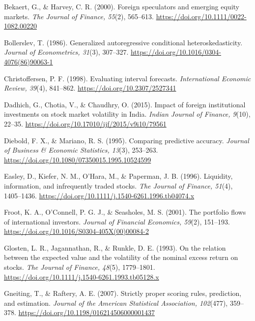 \documentclass[12pt]{article}
\newenvironment{apareferences}
  {\begin{list}{}{%
     \setlength{\leftmargin}{0.5in}%
     \setlength{\itemindent}{-0.5in}%
     \setlength{\listparindent}{0pt}%
     \setlength{\itemsep}{0.5\baselineskip}}}
  {\end{list}}
\begin{document}
\begin{singlespace}
\begin{apareferences}

\item Bekaert, G., \& Harvey, C. R. (2000). Foreign speculators and emerging
equity markets. \emph{The Journal of Finance, 55}(2), 565--613.
\url{https://doi.org/10.1111/0022-1082.00220}

\item Bollerslev, T. (1986). Generalized autoregressive conditional
heteroskedasticity. \emph{Journal of Econometrics, 31}(3), 307--327.
\url{https://doi.org/10.1016/0304-4076(86)90063-1}

\item Christoffersen, P. F. (1998). Evaluating interval forecasts.
\emph{International Economic Review, 39}(4), 841--862.
\url{https://doi.org/10.2307/2527341}

\item Dadhich, G., Chotia, V., \& Chaudhry, O. (2015). Impact of foreign
institutional investments on stock market volatility in India. \emph{Indian
Journal of Finance, 9}(10), 22--35.
\url{https://doi.org/10.17010/ijf/2015/v9i10/79561}

\item Diebold, F. X., \& Mariano, R. S. (1995). Comparing predictive accuracy.
\emph{Journal of Business \& Economic Statistics, 13}(3), 253--263.
\url{https://doi.org/10.1080/07350015.1995.10524599}

\item Easley, D., Kiefer, N. M., O'Hara, M., \& Paperman, J. B. (1996).
Liquidity, information, and infrequently traded stocks. \emph{The Journal of
Finance, 51}(4), 1405--1436.
\url{https://doi.org/10.1111/j.1540-6261.1996.tb04074.x}

\item Froot, K. A., O'Connell, P. G. J., \& Seasholes, M. S. (2001). The
portfolio flows of international investors. \emph{Journal of Financial
Economics, 59}(2), 151--193.
\url{https://doi.org/10.1016/S0304-405X(00)00084-2}

\item Glosten, L. R., Jagannathan, R., \& Runkle, D. E. (1993). On the
relation between the expected value and the volatility of the nominal excess
return on stocks. \emph{The Journal of Finance, 48}(5), 1779--1801.
\url{https://doi.org/10.1111/j.1540-6261.1993.tb05128.x}

\item Gneiting, T., \& Raftery, A. E. (2007). Strictly proper scoring rules,
prediction, and estimation. \emph{Journal of the American Statistical
Association, 102}(477), 359--378.
\url{https://doi.org/10.1198/016214506000001437}


\end{apareferences}
\end{singlespace}
\end{document}
